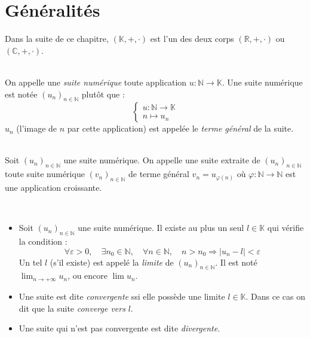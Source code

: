 \section{Généralités}
    Dans la suite de ce chapitre, \((\mathbb{K}, +, \cdot)\) est l'un des deux corps \((\mathbb{R}, +, \cdot)\) ou \((\mathbb{C}, +, \cdot)\).
    \begin{definition}\ \\
        On appelle une \emph{suite numérique} toute application \(u:\mathbb{N} \rightarrow \mathbb{K}\).
        Une suite numérique est notée \((u_n)_{n \in \mathbb{N}}\) plutôt que :
        \[
            \left\{
                \begin{array}{l}
                    u: \mathbb{N} \rightarrow \mathbb{K}\\
                    n \mapsto u_n
                \end{array}
            \right.    
        \]
        \(u_n\) (l'image de \(n\) par cette application) est appelée le \emph{terme général} de la suite.
    \end{definition}

    \begin{definition}\ \\
        Soit \((u_n)_{n\in\mathbb{N}}\) une suite numérique. On appelle une suite extraite de \((u_n)_{n\in\mathbb{N}}\) toute suite numérique \((v_n)_{n\in\mathbb{N}}\) de terme général \(v_n = u_{\varphi(n)}\) où \(\varphi: \mathbb{N} \rightarrow \mathbb{N}\) est une application croissante.
    \end{definition}
    
    \begin{thedef}\ \\
        \begin{itemize}
            \item Soit \((u_n)_{n\in\mathbb{N}}\) une suite numérique. Il existe au plus un seul \(l\in\mathbb{K}\) qui vérifie la condition :
            \[
                \forall \varepsilon > 0, \quad \exists n_0 \in \mathbb{N}, \quad \forall n \in \mathbb{N}, \quad n > n_0 \Rightarrow |u_n - l| < \varepsilon    
            \]
            Un tel \(l\) (s'il existe) est appelé la \emph{limite} de \((u_n)_{n\in\mathbb{N}}\). Il est noté \(\lim_{n\to+\infty}u_n\), ou encore \(\lim u_n\).
            \item Une suite est dite \emph{convergente} ssi elle possède une limite \(l \in\mathbb{K}\). Dans ce cas on dit que la suite \emph{converge vers} \(l\).
            \item Une suite qui n'est pas convergente est dite \emph{divergente}.
        \end{itemize}
    \end{thedef}

